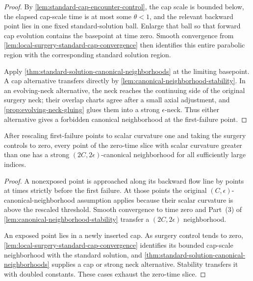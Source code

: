 \begin{proof}
By \ref{lem:standard-cap-encounter-control}, the cap scale is bounded below,
the elapsed cap-scale time is at most some $\theta<1$, and the relevant
backward point lies in one fixed standard-solution ball.  Enlarge that ball
so that forward cap evolution contains the basepoint at time zero.  Smooth
convergence from \ref{lem:local-surgery-standard-cap-convergence} then
identifies this entire parabolic region with the corresponding standard
solution region.

Apply \ref{thm:standard-solution-canonical-neighborhoods} at the limiting
basepoint.  A cap alternative transfers directly by
\ref{lem:canonical-neighborhood-stability}.  In an evolving-neck
alternative, the neck reaches the continuing side of the original surgery
neck; their overlap charts agree after a small axial adjustment, and
\ref{prop:evolving-neck-gluing} glues them into a strong
$\epsilon$-neck.  Thus either alternative gives a forbidden canonical
neighborhood at the first-failure point.
\end{proof}

\begin{lemma}
\label{lem:rescaled-high-curvature-canonical-control}
\notready
After rescaling first-failure points to scalar curvature one and taking the
surgery controls to zero, every point of the zero-time slice with scalar
curvature greater than one has a strong
$(2C,2\epsilon)$-canonical neighborhood for all sufficiently large indices.
\end{lemma}

\begin{proof}
A nonexposed point is approached along its backward flow line by points at
times strictly before the first failure.  At those points the original
$(C,\epsilon)$-canonical-neighborhood assumption applies because their
scalar curvature is above the rescaled threshold.  Smooth convergence to
time zero and Part~(3) of
\ref{lem:canonical-neighborhood-stability} transfer a
$(2C,2\epsilon)$ neighborhood.

An exposed point lies in a newly inserted cap.  As surgery control tends to
zero, \ref{lem:local-surgery-standard-cap-convergence} identifies its
bounded cap-scale neighborhood with the standard solution, and
\ref{thm:standard-solution-canonical-neighborhoods} supplies a cap or strong
neck alternative.  Stability transfers it with doubled constants.  These
cases exhaust the zero-time slice.
\end{proof}


